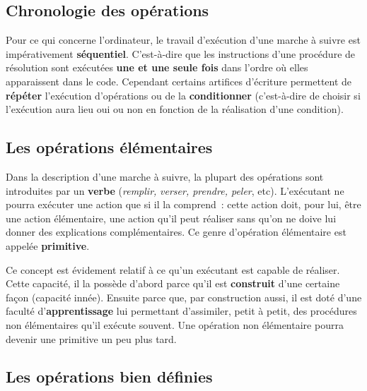 	\subsection{Chronologie des opérations}

		Pour ce qui concerne l’ordinateur, le travail d’exécution d’une marche à
		suivre est impérativement \textbf{séquentiel}. C’est-à-dire que les
		instructions d’une procédure de résolution sont exécutées \textbf{une
		et une seule fois} dans l’ordre où elles apparaissent dans le code.
		Cependant certains artifices d’écriture permettent de \textbf{répéter}
		l’exécution d’opérations ou de la \textbf{conditionner}
		(c'est-à-dire de choisir si
		l'exécution aura lieu oui ou non en fonction de la
		réalisation d'une condition).

	\subsection{Les opérations élémentaires}


		Dans la description d’une marche à suivre, la plupart des opérations
		sont introduites par un \textbf{verbe
		}(\textit{remplir,}\textbf{\textit{ }}\textit{verser, prendre, peler},
		etc). L’exécutant ne pourra exécuter une action que si il la comprend~:
		cette action doit, pour lui, être une action élémentaire, une action
		qu’il peut réaliser sans qu’on ne doive lui donner des explications
		complémentaires. Ce genre d’opération élémentaire est appelée
		\textbf{primitive}.
		
		Ce concept est évidement relatif à ce qu’un exécutant est capable de
		réaliser. Cette capacité, il la possède d’abord parce qu’il est
		\textbf{construit} d’une certaine façon (capacité innée). Ensuite parce
		que, par construction aussi, il est doté d’une faculté
		d’\textbf{apprentissage} lui permettant d’assimiler, petit à petit, des
		procédures non élémentaires qu’il exécute souvent. Une opération non
		élémentaire pourra devenir une primitive un peu plus tard.
		

	\subsection{Les opérations bien définies}

